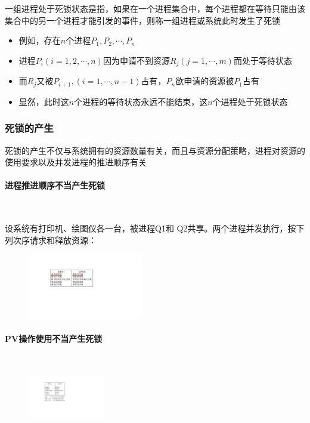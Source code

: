 \documentclass[cs4size,a4paper,10pt]{ctexart}
\begin{document}
	一组进程处于死锁状态是指，如果在一个进程集合中，每个进程都在等待只能由该集合中的另一个进程才能引发的事件，则称一组进程或系统此时发生了死锁
	\begin{itemize}
		\item 例如，存在$n$个进程$P_1,P_2,\cdots,P_n$
		\item 进程$P_i(i=1,2,\cdots,n)$因为申请不到资源$R_j(j=1,\cdots,m)$而处于等待状态
		\item 而$R_j$又被$P_{i+1},(i=1,\cdots,n-1)$占有，$P_n$欲申请的资源被$P_1$占有
		\item 显然，此时这$n$个进程的等待状态永远不能结束，这$n$个进程处于死锁状态
	\end{itemize}

	\subsubsection{死锁的产生}
	死锁的产生不仅与系统拥有的资源数量有关，而且与资源分配策略，进程对资源的使用要求以及并发进程的推进顺序有关

	\paragraph{进程推进顺序不当产生死锁}~{}

	设系统有打印机、绘图仪各一台，被进程Q1和 Q2共享。两个进程并发执行，按下列次序请求和释放资源：
	\begin{figure}[H]
		\centering
		\includegraphics[width=0.45\textwidth]{img/进程推进顺序不当产生死锁.pdf}
	\end{figure}

	\paragraph{PV操作使用不当产生死锁}~{}


	\begin{figure}[H]
		\centering
		\includegraphics[width=0.3\textwidth]{img/PV操作使用不当产生死锁.pdf}
	\end{figure}
\end{document}

